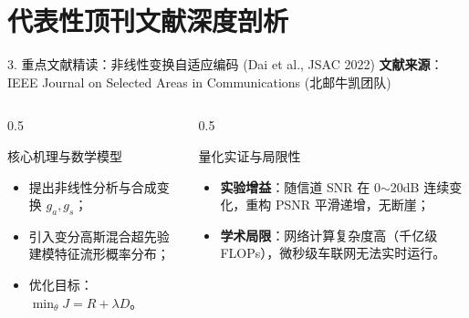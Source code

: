 \documentclass[aspectratio=169,10pt,UTF8]{ctexbeamer}
\begin{document}
\section{代表性顶刊文献深度剖析}
\begin{frame}{3. 重点文献精读：非线性变换自适应编码 (Dai et al., JSAC 2022)}
  \small
  \textbf{文献来源}：IEEE Journal on Selected Areas in Communications (北邮牛凯团队)
  \begin{columns}[T]
    \begin{column}{0.5\textwidth}
      \begin{block}{核心机理与数学模型}
        \begin{itemize}
          \item 提出非线性分析与合成变换 $g_a, g_s$；
          \item 引入变分高斯混合超先验建模特征流形概率分布；
          \item 优化目标：$\min_{\theta} J = R + \lambda D$。
        \end{itemize}
      \end{block}
    \end{column}
    \begin{column}{0.5\textwidth}
      \begin{block}{量化实证与局限性}
        \begin{itemize}
          \item \textbf{实验增益}：随信道 SNR 在 0$\sim$20dB 连续变化，重构 PSNR 平滑递增，无断崖；
          \item \textbf{学术局限}：网络计算复杂度高（千亿级 FLOPs），微秒级车联网无法实时运行。
        \end{itemize}
      \end{block}
    \end{column}
  \end{columns}
\end{frame}

\end{document}
